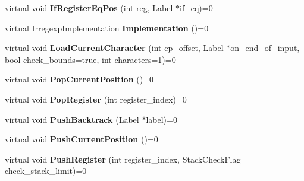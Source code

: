 \begin{DoxyCompactItemize}
\item 
\hypertarget{classv8_1_1internal_1_1_reg_exp_macro_assembler_a4097b2943c7d1e5aa0d44df625c5cdf4}{}virtual void {\bfseries If\+Register\+Eq\+Pos} (int reg, Label $\ast$if\+\_\+eq)=0\label{classv8_1_1internal_1_1_reg_exp_macro_assembler_a4097b2943c7d1e5aa0d44df625c5cdf4}

\item 
\hypertarget{classv8_1_1internal_1_1_reg_exp_macro_assembler_a95d43ccae92f8edbd7cfb002360fd151}{}virtual Irregexp\+Implementation {\bfseries Implementation} ()=0\label{classv8_1_1internal_1_1_reg_exp_macro_assembler_a95d43ccae92f8edbd7cfb002360fd151}

\item 
\hypertarget{classv8_1_1internal_1_1_reg_exp_macro_assembler_a19c605442aa08ffb088368a98fed0243}{}virtual void {\bfseries Load\+Current\+Character} (int cp\+\_\+offset, Label $\ast$on\+\_\+end\+\_\+of\+\_\+input, bool check\+\_\+bounds=true, int characters=1)=0\label{classv8_1_1internal_1_1_reg_exp_macro_assembler_a19c605442aa08ffb088368a98fed0243}

\item 
\hypertarget{classv8_1_1internal_1_1_reg_exp_macro_assembler_ad2077cab7ae1f13f8d8be972afd6e220}{}virtual void {\bfseries Pop\+Current\+Position} ()=0\label{classv8_1_1internal_1_1_reg_exp_macro_assembler_ad2077cab7ae1f13f8d8be972afd6e220}

\item 
\hypertarget{classv8_1_1internal_1_1_reg_exp_macro_assembler_accf76e0091230e0e29f58bed22826fcb}{}virtual void {\bfseries Pop\+Register} (int register\+\_\+index)=0\label{classv8_1_1internal_1_1_reg_exp_macro_assembler_accf76e0091230e0e29f58bed22826fcb}

\item 
\hypertarget{classv8_1_1internal_1_1_reg_exp_macro_assembler_a3c79da20c15da3339defb598cdaeb45e}{}virtual void {\bfseries Push\+Backtrack} (Label $\ast$label)=0\label{classv8_1_1internal_1_1_reg_exp_macro_assembler_a3c79da20c15da3339defb598cdaeb45e}

\item 
\hypertarget{classv8_1_1internal_1_1_reg_exp_macro_assembler_a96c21dc359474e6db50893c0b8fea4fe}{}virtual void {\bfseries Push\+Current\+Position} ()=0\label{classv8_1_1internal_1_1_reg_exp_macro_assembler_a96c21dc359474e6db50893c0b8fea4fe}

\item 
\hypertarget{classv8_1_1internal_1_1_reg_exp_macro_assembler_a2d225e3c6813a1f170ae2aeb48898490}{}virtual void {\bfseries Push\+Register} (int register\+\_\+index, Stack\+Check\+Flag check\+\_\+stack\+\_\+limit)=0\label{classv8_1_1internal_1_1_reg_exp_macro_assembler_a2d225e3c6813a1f170ae2aeb48898490}


\end{DoxyCompactItemize}
